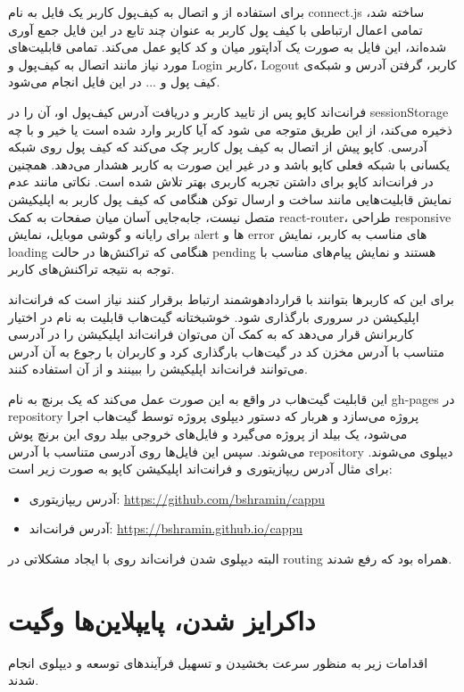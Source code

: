 برای استفاده از
و اتصال به کیف‌پول کاربر یک فایل به نام connect.js ساخته شد، تمامی اعمال ارتباطی با کیف پول کاربر به عنوان چند تابع در این فایل جمع آوری شده‌اند، این فایل به صورت یک آداپتور میان
و کد کاپو عمل می‌کند. تمامی قابلیت‌های مورد نیاز مانند اتصال به کیف‌پول و
\gls{Login}
کاربر،
\gls{Logout}
کاربر، گرفتن آدرس و شبکه‌ی کیف پول و ... در این فایل انجام می‌شود.

فرانت‌اند کاپو پس از تایید کاربر و دریافت آدرس کیف‌پول او، آن را در sessionStorage ذخیره می‌کند، از این طریق متوجه می شود که آیا کاربر وارد شده است یا خیر و با چه آدرسی. کاپو پیش از اتصال به کیف پول کاربر چک می‌کند که کیف پول روی شبکه یکسانی با شبکه فعلی کاپو باشد و در غیر این صورت به کاربر هشدار می‌دهد. همچنین در فرانت‌اند کاپو برای داشتن تجربه کاربری بهتر تلاش شده است. نکاتی مانند عدم نمایش قابلیت‌هایی مانند ساخت و ارسال توکن هنگامی که کیف پول کاربر به اپلیکیشن متصل نیست، جابه‌جایی آسان میان صفحات به کمک react-router، طراحی responsive برای رایانه و گوشی موبایل، نمایش alert ها و error های مناسب به کاربر، نمایش loading هنگامی که تراکنش‌ها در حالت pending هستند و نمایش پیام‌های مناسب با توجه به نتیجه تراکنش‌های کاربر.

برای این که کاربرها بتوانند با قراردادهوشمند ارتباط برقرار کنند نیاز است که فرانت‌اند اپلیکیشن در سروری بارگذاری شود. خوشبختانه گیت‌هاب قابلیت به نام
در اختیار کاربرانش قرار می‌دهد که به کمک آن می‌توان فرانت‌اند اپلیکیشن را در آدرسی متناسب با آدرس مخزن کد در گیت‌هاب بارگذاری کرد و کاربران با رجوع به آن آدرس می‌توانند فرانت‌اند اپلیکیشن را ببینند و از آن استفاده کنند.

این قابلیت گیت‌هاب در واقع به این صورت عمل می‌کند که یک برنچ به نام gh-pages در repository پروژه می‌سازد و هربار که دستور دیپلوی پروژه توسط گیت‌هاب اجرا می‌شود، یک بیلد از پروژه می‌گیرد و فایل‌های خروجی بیلد روی این برنچ پوش می‌شوند. سپس این فایل‌ها روی آدرسی متناسب با آدرس repository دیپلوی می‌شوند. برای مثال آدرس ریپازیتوری و فرانت‌اند اپلیکیشن کاپو به صورت زیر است:
\begin{itemize}
  \item
  آدرس ریپازیتوری: \url{https://github.com/bshramin/cappu}
  \item
  آدرس فرانت‌اند: \url{https://bshramin.github.io/cappu}
\end{itemize}
البته دیپلوی شدن فرانت‌اند روی
با ایجاد مشکلاتی در routing همراه بود که رفع شدند.


\section{داکرایز شدن، پایپلاین‌ها وگیت}
اقدامات زیر به منظور سرعت بخشیدن و تسهیل فرآیندهای توسعه و دیپلوی انجام شدند.

